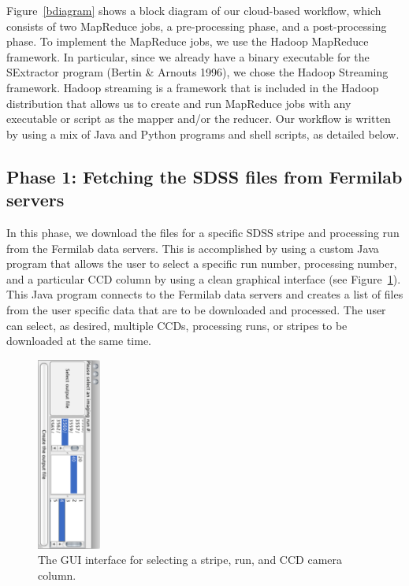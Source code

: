 Figure~\ref{bdiagram} shows a block diagram of our cloud-based workflow, which consists of two MapReduce jobs, a pre-processing phase, and a post-processing phase.
To implement the MapReduce jobs, we use the Hadoop MapReduce framework. In particular, since we already have a binary executable for the SExtractor program (Bertin \& Arnouts 1996), we chose the Hadoop Streaming framework. 
Hadoop streaming is a framework that is included in the Hadoop distribution that allows us to create and run MapReduce jobs with any executable or script as the mapper and/or the reducer. Our workflow is written by using a mix of Java and Python programs and shell scripts, as detailed below.

\subsection{Phase 1: Fetching the SDSS files from Fermilab servers}
In this phase, we download the files for a specific SDSS stripe and processing run from the Fermilab data servers. This is accomplished by using a custom Java program that allows the user to select a specific run number, processing number, and a particular CCD column by using a clean graphical interface (see Figure~\ref{gui}). This Java program connects to the Fermilab data servers and creates a list of files from the user specific data that are to be downloaded and processed. The user can select, as desired, multiple CCDs, processing runs, or stripes to be downloaded at the same time.


\begin{figure}[h!]
	\vspace{0in}
	\centering
	\includegraphics[height=2.5in, angle=90]{part4/Farivar_O12/javaGui.eps}
	\caption{The GUI interface for selecting a stripe, run, and CCD camera column.}
	\label{gui}
\end{figure}



